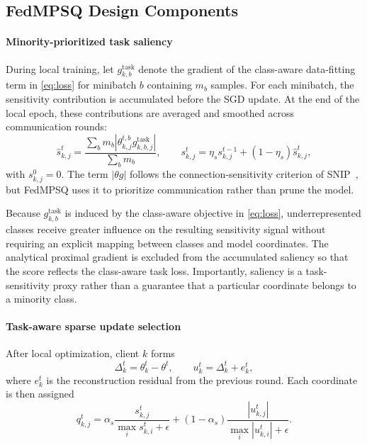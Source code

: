 \documentclass[conference,a4paper]{IEEEtran}
\begin{document}
\subsection{FedMPSQ Design Components}

\paragraph{Minority-prioritized task saliency}
During local training, let $g_{k,b}^{\mathrm{task}}$ denote the gradient of the
class-aware data-fitting term in \eqref{eq:loss} for minibatch $b$ containing
$m_b$ samples. For each minibatch, the sensitivity contribution is accumulated
before the SGD update. At the end of the local epoch, these contributions are
averaged and smoothed across communication rounds:
\begin{equation}
\hat{s}_{k,j}^t
=
\frac{
\sum_b m_b
\left|
\theta_{k,j}^{t,b}
g_{k,b,j}^{\mathrm{task}}
\right|
}{
\sum_b m_b
},
\qquad
s_{k,j}^t
=
\eta_s s_{k,j}^{t-1}
+
(1-\eta_s)\hat{s}_{k,j}^t ,
\label{eq:saliency}
\end{equation}
with $s_{k,j}^{0}=0$. The term $|\theta g|$ follows the connection-sensitivity
criterion of SNIP~\cite{lee2019snip}, but FedMPSQ uses it to prioritize
communication rather than prune the model.

Because $g_{k,b}^{\mathrm{task}}$ is induced by the class-aware objective in
\eqref{eq:loss}, underrepresented classes receive greater influence on the
resulting sensitivity signal without requiring an explicit mapping between
classes and model coordinates. The analytical proximal gradient is excluded
from the accumulated saliency so that the score reflects the class-aware task
loss. Importantly, saliency is a task-sensitivity proxy rather than a
guarantee that a particular coordinate belongs to a minority class.

\paragraph{Task-aware sparse update selection}
After local optimization, client $k$ forms
\begin{equation}
\Delta_k^t=\theta_k^t-\theta^t,
\qquad
u_k^t=\Delta_k^t+e_k^t,
\label{eq:residual_input}
\end{equation}
where $e_k^t$ is the reconstruction residual from the previous round. Each
coordinate is then assigned
\begin{equation}
q_{k,j}^t
=
\alpha_s
\frac{s_{k,j}^t}
{\max_i s_{k,i}^t+\epsilon}
+
(1-\alpha_s)
\frac{|u_{k,j}^t|}
{\max_i|u_{k,i}^t|+\epsilon}.
\label{eq:score}
\end{equation}
\end{document}
